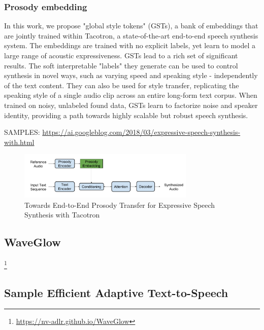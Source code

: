 \subsubsection{Prosody embedding}
 In this work, we propose "global style tokens" (GSTs), a bank of embeddings that are jointly trained within Tacotron, a state-of-the-art end-to-end speech synthesis system. The embeddings are trained with no explicit labels, yet learn to model a large range of acoustic expressiveness. GSTs lead to a rich set of significant results. The soft interpretable "labels" they generate can be used to control synthesis in novel ways, such as varying speed and speaking style - independently of the text content. They can also be used for style transfer, replicating the speaking style of a single audio clip across an entire long-form text corpus. When trained on noisy, unlabeled found data, GSTs learn to factorize noise and speaker identity, providing a path towards highly scalable but robust speech synthesis. 

SAMPLES:
\url{https://ai.googleblog.com/2018/03/expressive-speech-synthesis-with.html}
\begin{figure}[]
    \centering
    \includegraphics[width=0.75\textwidth]{figures/tacotron_prosody.png}
    \caption{Towards End-to-End Prosody Transfer for Expressive Speech Synthesis with Tacotron \cite{skerry2018towards}}
    \label{fig:tts}
\end{figure}

\subsection{WaveGlow}
\footnote{\url{https://nv-adlr.github.io/WaveGlow}}


\subsection{Sample Efficient Adaptive Text-to-Speech}

